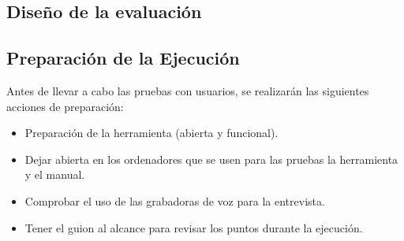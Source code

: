 \subsection{Diseño de la evaluación}

\subsection{Preparación de la Ejecución}
Antes de llevar a cabo las pruebas con usuarios, se realizarán las siguientes acciones de preparación:
\begin{itemize}
\item Preparación de la herramienta (abierta y funcional).
\item Dejar abierta en los ordenadores que se usen para las pruebas la herramienta y el manual.
\item Comprobar el uso de las grabadoras de voz para la entrevista.
\item Tener el guion al alcance para revisar los puntos durante la ejecución.
\end{itemize}

